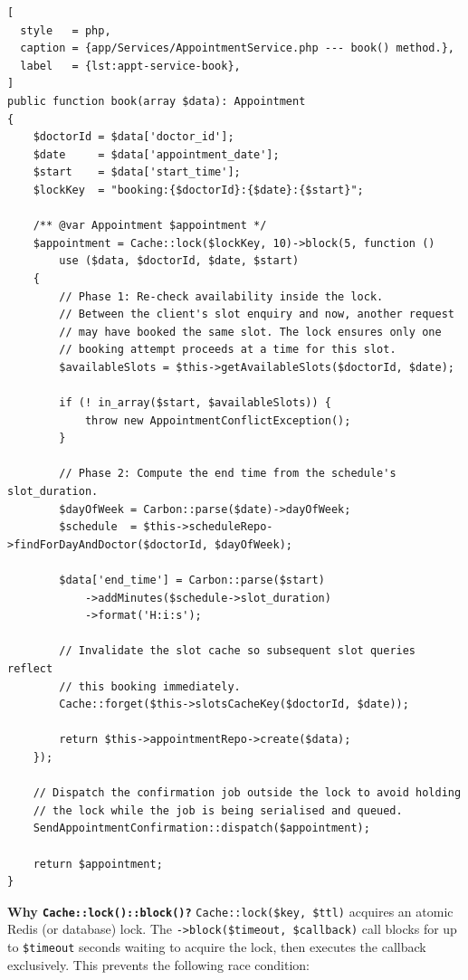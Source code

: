\begin{lstlisting}[
  style   = php,
  caption = {app/Services/AppointmentService.php --- book() method.},
  label   = {lst:appt-service-book},
]
public function book(array $data): Appointment
{
    $doctorId = $data['doctor_id'];
    $date     = $data['appointment_date'];
    $start    = $data['start_time'];
    $lockKey  = "booking:{$doctorId}:{$date}:{$start}";

    /** @var Appointment $appointment */
    $appointment = Cache::lock($lockKey, 10)->block(5, function ()
        use ($data, $doctorId, $date, $start)
    {
        // Phase 1: Re-check availability inside the lock.
        // Between the client's slot enquiry and now, another request
        // may have booked the same slot. The lock ensures only one
        // booking attempt proceeds at a time for this slot.
        $availableSlots = $this->getAvailableSlots($doctorId, $date);

        if (! in_array($start, $availableSlots)) {
            throw new AppointmentConflictException();
        }

        // Phase 2: Compute the end time from the schedule's slot_duration.
        $dayOfWeek = Carbon::parse($date)->dayOfWeek;
        $schedule  = $this->scheduleRepo->findForDayAndDoctor($doctorId, $dayOfWeek);

        $data['end_time'] = Carbon::parse($start)
            ->addMinutes($schedule->slot_duration)
            ->format('H:i:s');

        // Invalidate the slot cache so subsequent slot queries reflect
        // this booking immediately.
        Cache::forget($this->slotsCacheKey($doctorId, $date));

        return $this->appointmentRepo->create($data);
    });

    // Dispatch the confirmation job outside the lock to avoid holding
    // the lock while the job is being serialised and queued.
    SendAppointmentConfirmation::dispatch($appointment);

    return $appointment;
}
\end{lstlisting}

\textbf{Why \texttt{Cache::lock()::block()?}}
\texttt{Cache::lock(\$key, \$ttl)} acquires an atomic Redis (or database)
lock. The \texttt{->block(\$timeout, \$callback)} call blocks for up to
\texttt{\$timeout} seconds waiting to acquire the lock, then executes the
callback exclusively. This prevents the following race condition:

